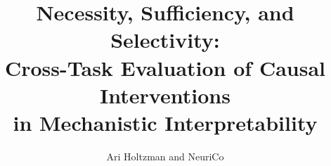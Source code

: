 \documentclass{article}
\title{Necessity, Sufficiency, and Selectivity:\\ Cross-Task Evaluation of Causal Interventions\\ in Mechanistic Interpretability}
\author{
  Ari Holtzman and NeuriCo
}
\begin{document}
\maketitle

\begin{abstract}

\end{abstract}









\end{document}
